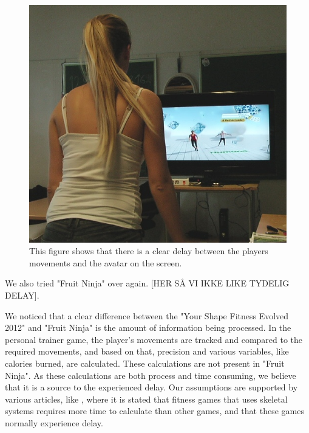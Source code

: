 \begin{figure} [H]
\centering
\includegraphics[scale=0.6]{kineDelay.jpg}
\caption[Kinect sensor delay]{This figure shows that there is a clear delay between the players movements and the avatar on the screen.}
\label{fig:remakeDelay}
\end{figure} 

We also tried "Fruit Ninja" over again. [HER SÅ VI IKKE LIKE TYDELIG DELAY].

We noticed that a clear difference between the "Your Shape Fitness Evolved 2012" and "Fruit Ninja" is the amount of information being processed. In the personal trainer game, the player's movements are tracked and compared to the required movements, and based on that, precision and various variables, like calories burned, are calculated. These calculations are not present in "Fruit Ninja". As these calculations are both process and time consuming, we believe that it is a source to the experienced delay. Our assumptions are supported by various articles, like \cite{kinectLag}, where it is stated that fitness games that uses skeletal systems requires more time to calculate than other games, and that these games normally experience delay. 

